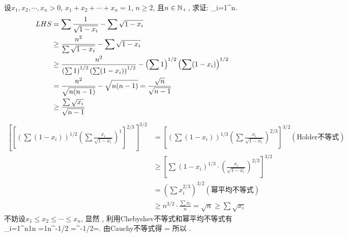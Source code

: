 \bq{}{}
设$x_{1},x_{2},\cdots,x_{n}>0$, $x_{1}+x_{2}+\cdots+x_{n}=1$, $n\ge2$,
且$n\in\mathbb{N}_{+}$, 求证:
\bee
\sum_{i=1}^{n}\ge{}.
\eee
\eq
\ba
\begin{align*}
LHS & =\sum\frac{1}{\sqrt{1-x_{i}}}-\sum\sqrt{1-x_{i}}\\
 & \ge\frac{n^{2}}{\sum\sqrt{1-x_{i}}}-\sum\sqrt{1-x_{i}}\\
 & \ge\frac{n^{2}}{\left(\sum1\right)^{1/2}\left(\sum(1-x_{i})\right)^{1/2}}-\left(\sum1\right)^{1/2}\left(\sum(1-x_{i})\right)^{1/2}\\
 & =\frac{n^{2}}{\sqrt{n(n-1)}}-\sqrt{n(n-1)}=\frac{\sqrt{n}}{\sqrt{n-1}}\\
 & \ge\frac{\sum\sqrt{x_{i}}}{\sqrt{n-1}}
\end{align*}
\ea
\ba
\begin{align*}
\left[\left[\left(\sum(1-x_{i})\right)^{1/2}\left(\sum\frac{x_{i}}{\sqrt{1-x_{i}}}\right)^{1}\right]^{2/3}\right]^{3/2} & =\left[\left(\sum(1-x_{i})\right)^{1/3}\left(\sum\frac{x_{i}}{\sqrt{1-x_{i}}}\right)^{2/3}\right]^{3/2}(\text{Holder不等式})\\
 & \ge\left[\sum(1-x_{i})^{1/3}\cdot\left(\frac{x_{i}}{\sqrt{1-x_{i}}}\right)^{2/3}\right]^{3/2}\\
 & =\left(\sum x_{i}^{2/3}\right)^{3/2}(\text{幂平均不等式})\\
 & \ge n^{3/2}\cdot\frac{\sum x_{i}}{n}=\sqrt{n}\ge\sum\sqrt{x_{i}}
\end{align*}
\ea
\ba
不妨设$x_1\le x_2\le\cdots\le x_n$, 显然
\bee
{}\le{}\le\cdots\le{},
\eee
利用Chebyshev不等式和幂平均不等式有
\bee
\sum_{i=1}^n\ge\frac1n\cdot{}
  =\frac1n\sum{}\ge{}^{-1/2}
  =^{-1/2}=.
\eee
由Cauchy不等式得
\bee
\sum{}\le{}=
\eee
所以
\bee
\sum{}\ge{}\ge{}.
\eee
\ea

